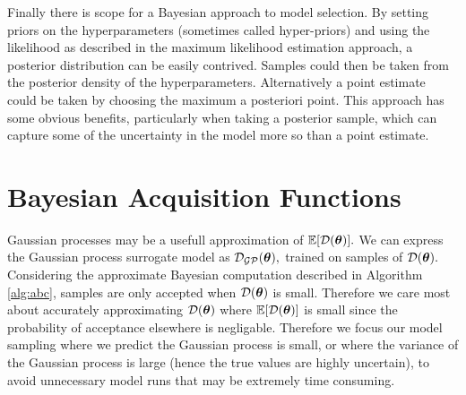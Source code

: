 Finally there is scope for a Bayesian approach to model selection. By setting
priors on the hyperparameters (sometimes called hyper-priors)
and using the likelihood as described
in the maximum likelihood estimation approach, a posterior distribution can be
easily contrived. Samples could then be taken from the posterior density
of the hyperparameters. Alternatively a point estimate could be taken by
choosing the maximum a posteriori point. This
approach has some obvious benefits, particularly when taking a posterior
sample, which can capture some of the uncertainty in the model more so than
a point estimate.




\section{Bayesian Acquisition Functions}

Gaussian processes may be a usefull approximation of $\operatorname{\mathbb{E}}[\mathcal{D}(\bm{\theta})].$ We can
express the Gaussian process surrogate model as $\mathcal{D}_{\mathcal{GP}}(\bm{\theta}),$ trained on
samples of $\mathcal{D}(\bm{\theta}).$
Considering the approximate Bayesian computation described in
Algorithm \ref{alg:abc}, samples are only accepted when $\mathcal{D}(\bm{\theta})$ is small.
Therefore we care most about accurately approximating $\mathcal{D}(\bm{\theta})$ where
$\operatorname{\mathbb{E}}[\mathcal{D}(\bm{\theta})]$ is small since the probability of acceptance elsewhere is
negligable. Therefore we focus our model sampling where we predict the Gaussian
process is small, or where the variance of the Gaussian process is large
(hence the true values are highly uncertain), to avoid unnecessary model runs
that may be extremely time consuming.

